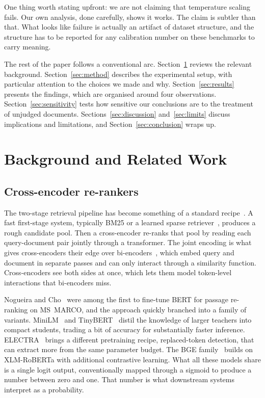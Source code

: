 One thing worth stating upfront: we are not claiming that temperature scaling fails.
Our own analysis, done carefully, shows it works. The claim is subtler than that.
What looks like failure is actually an artifact of dataset structure, and the
structure has to be reported for any calibration number on these benchmarks to carry
meaning.

The rest of the paper follows a conventional arc. Section~\ref{sec:related} reviews
the relevant background. Section~\ref{sec:method} describes the experimental setup,
with particular attention to the choices we made and why. Section~\ref{sec:results}
presents the findings, which are organised around four observations.
Section~\ref{sec:sensitivity} tests how sensitive our conclusions are to the
treatment of unjudged documents. Sections~\ref{sec:discussion} and~\ref{sec:limits}
discuss implications and limitations, and Section~\ref{sec:conclusion} wraps up.

\section{Background and Related Work}
\label{sec:related}

\subsection{Cross-encoder re-rankers}
The two-stage retrieval pipeline has become something of a standard
recipe~\cite{nogueira2019}. A fast first-stage system, typically BM25 or a learned
sparse retriever~\cite{robertson2009bm25}, produces a rough candidate pool. Then a
cross-encoder re-ranks that pool by reading each query-document pair jointly through
a transformer. The joint encoding is what gives cross-encoders their edge over
bi-encoders~\cite{reimers2019sbert}, which embed query and document in separate
passes and can only interact through a similarity function. Cross-encoders see both
sides at once, which lets them model token-level interactions that bi-encoders miss.

Nogueira and Cho~\cite{nogueira2019} were among the first to fine-tune BERT for
passage re-ranking on MS~MARCO, and the approach quickly branched into a family of
variants. MiniLM~\cite{wang2020minilm} and TinyBERT~\cite{jiao2020tinybert} distil
the knowledge of larger teachers into compact students, trading a bit of accuracy for
substantially faster inference. ELECTRA~\cite{clark2020electra} brings a different
pretraining recipe, replaced-token detection, that can extract more from the same
parameter budget. The BGE family~\cite{xiao2023bge} builds on XLM-RoBERTa with
additional contrastive learning. What all these models share is a single logit output,
conventionally mapped through a sigmoid to produce a number between zero and one.
That number is what downstream systems interpret as a probability.

